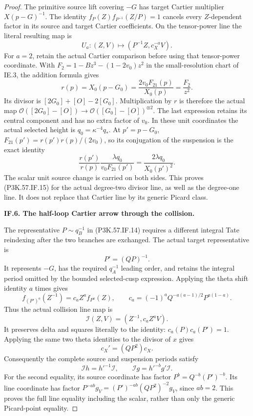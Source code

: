 \begin{proof}
The primitive source lift covering \(-G\) has target
Cartier multiplier \(X(p-G)^{-1}\). The identity
\(f_P(Z)f_{P^{-1}}(Z/P)=1\) cancels every
\(Z\)-dependent factor in its source and target
Cartier coefficients. On the tensor-power line the
literal resulting map is
\[
          U_a:(Z,V)\longmapsto(P^{-1}Z,c_X^{-a}V).
                                                               \tag{P3K.57.IF.16d}
\]
For \(a=2\), retain the actual Cartier comparison
before using that tensor-power coordinate. With
\(F_2=1-Bz^3-(1-2v_0)z^2\) in the small-resolution
chart of IE.3, the addition formula gives
\[
 r(p)=X_0(p-G_0)=\frac{2v_0F_{21}(p)}{X_0(p)}
                         =\frac{F_2}{z^2}.             \tag{P3K.57.IF.16e}
\]
Its divisor is \([2G_0]+[O]-2[G_0]\). Multiplication
by \(r\) is therefore the actual map
\(\mathcal O([2G_0]-[O])\to
\mathcal O([G_0]-[O])^{\otimes2}\). The last
expression retains its central component and has no
extra factor of \(v_0\). In these unit coordinates the
actual selected height is \(q_0=\kappa^{-4}q_*\).
At \(p'=p-G_0\),
\(F_{21}(p')=r(p')r(p)/(2v_0)\), so its conjugation
of the suspension is the exact identity
\[
 \frac{r(p')}{r(p)}\frac{\lambda q_0}{v_0F_{21}(p')}
                   =\frac{2\lambda q_0}{X_0(p')^2}.
                                                               \tag{P3K.57.IF.16f}
\]
The scalar unit source change is carried on both sides.
This proves (P3K.57.IF.15) for the actual degree-two divisor
line, as well as the degree-one line. It does not
replace that Cartier line by its generic Picard class.

\par\medskip\noindent\textbf{IF.6. The half-loop Cartier arrow through the collision.}\par\nopagebreak[4]

The representative \(P\sim q_B^{-1}\) in (P3K.57.IF.14) requires a different
integral Tate reindexing after the two branches are exchanged. The actual
target representative is
\[
                       P'=(QP)^{-1}.                   \tag{P3K.57.IF.17}
\]
It represents \(-G\), has the required \(q_A^{-1}\) leading order, and
retains the integral period omitted by the bounded selected-cusp expression.
Applying the theta shift identity \(a\) times gives
\[
 f_{(P')^a}(Z^{-1})
   =c_a Z^a f_{P^a}(Z),\qquad
 c_a=(-1)^aQ^{-a(a-1)/2}P^{a(1-a)}.                    \tag{P3K.57.IF.18}
\]
Thus the actual collision line map is
\[
              \mathcal I(Z,V)=(Z^{-1},c_a Z^aV).        \tag{P3K.57.IF.19}
\]
It preserves delta and squares literally to the identity:
\(c_a(P)c_a(P')=1\).
Applying the same two theta identities to the divisor of \(x\) gives
\[
                   c_X'=(QP^2)c_X .                    \tag{P3K.57.IF.20}
\]
Consequently the complete source and suspension periods satisfy
\[
 \mathcal I h=h'^{-1}\mathcal I,\qquad
 \mathcal I g=h'^{-b}g'\mathcal I.                      \tag{P3K.57.IF.21}
\]
For the second equality, its source coordinate has factor
\(P^b=Q^{-b}(P')^{-b}\). Its line coordinate has factor
\(P^{-ab}g_V=(P')^{-ab}(QP^2)^{-2}g_V\), since \(ab=2\).
This proves the full line equality including the scalar, rather than only
the generic Picard-point equality.


\end{proof}
